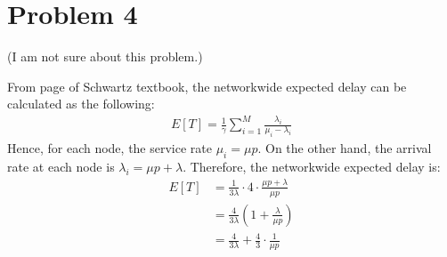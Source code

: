 \documentclass{article}
\begin{document}
\section*{Problem 4}
	(I am not sure about this problem.)

	From page of Schwartz textbook, the networkwide expected delay can be
	calculated as the following:
	\begin{align*}
		E[T] = \frac{1}{\gamma} \sum\limits_{i=1}^{M} \frac{\lambda_{i}}{\mu_{i} - \lambda_{i}}
	\end{align*}
	Hence, for each node, the service rate $\mu_{i} = \mu p$. On the other
	hand, the arrival rate at each node is $\lambda_{i} = \mu p + \lambda$.
	Therefore, the networkwide expected delay is:
	\begin{align*}
		E[T] &= \frac{1}{3\lambda} \cdot 4 \cdot \frac{\mu p + \lambda}{\mu p} \\
		&= \frac{4}{3\lambda} \left( 1 + \frac{\lambda}{\mu p} \right) \\
		&= \frac{4}{3\lambda} + \frac{4}{3} \cdot \frac{1}{\mu p}
	\end{align*}
\end{document}
